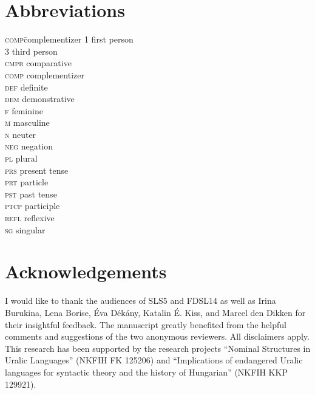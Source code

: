 \documentclass[output=paper]{langscibook}
\begin{document}
\section*{Abbreviations}
\begin{multicols}{3}
\begin{tabbing}
\textsc{comp}\hspace{.75em}\= complementizer\kill
\textsc{1} \> first person\\ 
\textsc{3} \> third person\\
\textsc{cmpr} \> comparative\\
\textsc{comp} \> complementizer\\
\textsc{def} \> definite\\
\textsc{dem} \> demonstrative\\
\textsc{f} \> feminine\\
\textsc{m} \> masculine\\
\textsc{n} \> neuter\\
\textsc{neg} \> negation\\
\textsc{pl} \> plural\\
\textsc{prs} \> present tense\\
\textsc{prt} \> particle\\
\textsc{pst} \> past tense\\
\textsc{ptcp} \> participle\\
\textsc{refl} \> reflexive\\
\textsc{sg} \> singular\\
\end{tabbing}
\end{multicols}

\section*{Acknowledgements}
\begin{sloppypar}
I would like to thank the audiences of SLS5 and FDSL14 as well as Irina Burukina, Lena Borise, Éva Dékány, Katalin É. Kiss, and Marcel den Dikken for their insightful feedback. The manuscript greatly benefited from the helpful comments and suggestions of the two anonymous reviewers. All disclaimers apply. This research has been supported by the research projects ``Nominal Structures in Uralic Languages'' (NKFIH FK 125206) and ``Implications of endangered Uralic languages for syntactic theory and the history of Hungarian'' (NKFIH KKP 129921).
\end{sloppypar}

\printbibliography[heading=subbibliography,notkeyword=this]
\end{document}
